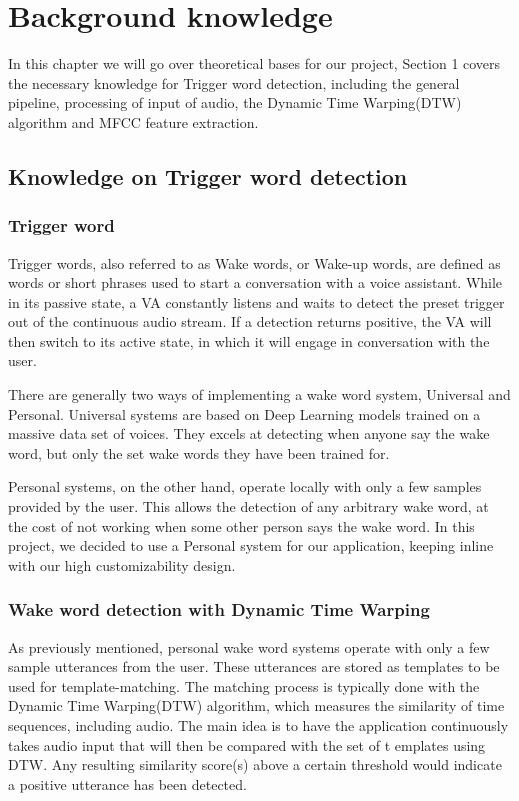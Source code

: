 
\chapter{Background knowledge}

    In this chapter we will go over theoretical bases for our project, Section 1 covers the necessary knowledge for Trigger word detection, including the general pipeline, processing of input of audio, the Dynamic Time Warping(DTW) algorithm and MFCC feature extraction.

\section{Knowledge on Trigger word detection}
    \subsection{Trigger word}
    Trigger words, also referred to as Wake words, or Wake-up words, are defined as words or short phrases used to start a conversation with a voice assistant. While in its passive state, a VA constantly listens and waits to detect the preset trigger out of the continuous audio stream. If a detection returns positive, the VA will then switch to its active state, in which it will engage in conversation with the user. 
    
    There are generally two ways of implementing a wake word system, Universal and Personal\cite{snips}. Universal systems are based on Deep Learning models trained on a massive data set of voices. They excels at detecting when anyone say the wake word, but only the set wake words they have been trained for.
    
    Personal systems, on the other hand, operate locally with only a few samples provided by the user. This allows the detection of any arbitrary wake word, at the cost of not working when some other person says the wake word.
    In this project, we decided to use a Personal system for our application, keeping inline with our high customizability design.
    
    \subsection{Wake word detection with Dynamic Time Warping}
    As previously mentioned, personal wake word systems operate with only a few sample utterances from the user. These utterances are stored as templates to be used for template-matching. The matching process is typically done with the Dynamic Time Warping(DTW) algorithm, which measures the similarity of time sequences, including audio. The main idea is to have the application continuously takes audio input that will then be compared with the set of t emplates using DTW. Any resulting similarity score(s) above a certain threshold would indicate a positive utterance has been detected.
    
